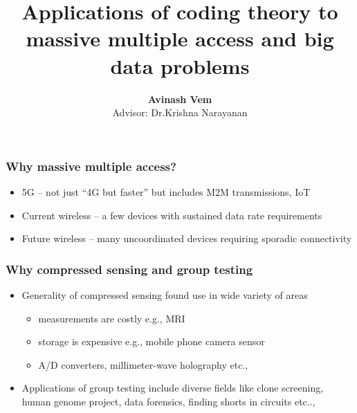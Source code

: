 \documentclass[10pt,usenames,dvipsnames]{beamer}
\def\figpath{../Figures}
\def\mac_figpath{../Figures/MAC}
\begin{document}
\title{\bf Applications of coding theory to massive multiple access and big data problems}
\author{\textbf{Avinash Vem}\\ \vspace{3pt} \small Advisor: Dr.Krishna Narayanan} 
\vspace{4ex}
\date{} %


\frame{\titlepage}

\begin{frame}
\frametitle{Why massive multiple access?}

\begin{itemize}
\item 5G -- not just ``4G but faster'' but includes M2M transmissions, IoT
\item Current wireless -- a few devices with sustained data rate requirements
\item Future wireless -- {\color{blue}many uncoordinated} devices requiring {\color{blue}sporadic connectivity}
\end{itemize}



\end{frame}

\begin{frame}
\frametitle{Why compressed sensing and group testing}
\begin{itemize}
\setlength\itemsep{6pt}

	\item Generality of compressed sensing found use in wide variety of areas
	\begin{itemize}
	\setlength\itemsep{3pt}
 		\item measurements are costly e.g., MRI
		\item storage is expensive e.g., mobile phone camera sensor
		\item A/D converters, millimeter-wave holography etc.,
	\end{itemize}
	\item Applications of group testing include diverse fields like clone screening, human genome project, data forensics, finding shorts in circuits etc..,
\end{itemize}
\end{frame}
\end{document}
